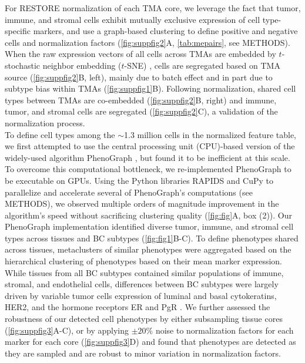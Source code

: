 \documentclass[preprint,review,3p,12pt]{elsarticle}
\begin{document}
For RESTORE normalization \cite{Chang2020} of each TMA core, we leverage the fact that tumor, immune, and stromal cells exhibit mutually exclusive expression of cell type-specific markers, and use a graph-based clustering to define positive and negative cells and normalization factors (\autoref{fig:suppfig2}A, \autoref{tab:mepairs}, see METHODS). When the raw expression vectors of all cells across TMAs are embedded by $t$-stochastic neighbor embedding ($t$-SNE) \cite{tsne2008}, cells are segregated based on TMA source (\autoref{fig:suppfig2}B, left), mainly due to batch effect and in part due to subtype bias within TMAs (\autoref{fig:suppfig1}B). Following normalization, shared cell types between TMAs are co-embedded (\autoref{fig:suppfig2}B, right) and immune, tumor, and stromal cells are segregated (\autoref{fig:suppfig2}C), a validation of the normalization process.\\

To define cell types among the $\sim$1.3 million cells in the normalized feature table, we first attempted to use the central processing unit (CPU)-based version of the widely-used algorithm PhenoGraph \cite{Levine2015}, but found it to be inefficient at this scale. To overcome this computational bottleneck, we re-implemented PhenoGraph to be executable on GPUs. Using the Python libraries RAPIDS \cite{cuml2020} and CuPy \cite{cupy2017} to parallelize and accelerate several of PhenoGraph's computations (see METHODS), we observed multiple orders of magnitude improvement in the algorithm's speed without sacrificing clustering quality (\autoref{fig:fig}A, box (2)). Our PhenoGraph implementation identified diverse tumor, immune, and stromal cell types across tissues and BC subtypes (\autoref{fig:fig1}B-C). To define phenotypes shared across tissues, metaclusters of similar phenotypes were aggregated based on the hierarchical clustering of phenotypes based on their mean marker expression. While tissues from all BC subtypes contained similar populations of immune, stromal, and endothelial cells, differences between BC subtypes were largely driven by variable tumor cells expression of luminal and basal cytokeratins, HER2, and the hormone receptors ER and PgR \cite{jackson_single-cell_2020}. We further assessed the robustness of our detected cell phenotypes by either subsampling tissue cores (\autoref{fig:suppfig3}A-C), or by applying $\pm20\%$ noise to normalization factors for each marker for each core (\autoref{fig:suppfig3}D) and found that phenotypes are detected as they are sampled and are robust to minor variation in normalization factors.\\
\end{document}
